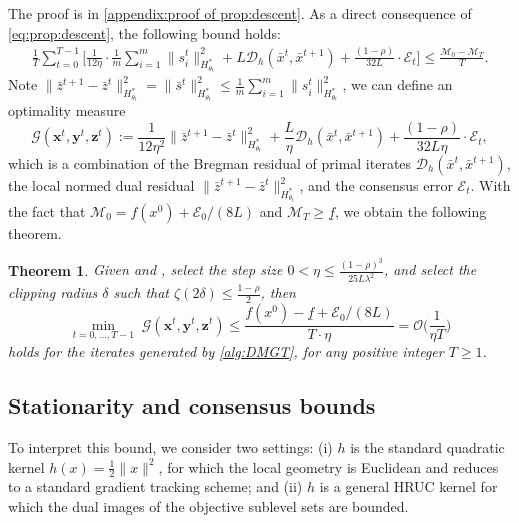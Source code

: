 \documentclass{article}
\theoremstyle{plain}
\newtheorem{theorem}{Theorem}[section]
\theoremstyle{definition}
\theoremstyle{remark}
\newcommand{\sL}{L}
\newcommand{\cO}{\mathcal O}
\newcommand{\cE}{\mathcal E}
\newcommand{\cD}{\mathcal{D}_{h}}
\newcommand{\cM}{\mathcal{M}}
\newcommand{\bx}{\mathbf{x}}
\newcommand{\by}{\mathbf{y}}
\newcommand{\bz}{\mathbf{z}}
\begin{document}
The proof is in \cref{appendix:proof of prop:descent}.
As a direct consequence of \eqref{eq:prop:descent}, the following bound holds:
\begin{equation*} \begin{aligned}
    \frac{1}{T}\sum_{t=0}^{T-1} \bigg[\frac{1}{12\eta}\cdot \frac{1}{m}{\sum}_{i=1}^m\|s^t_i\|_{H_{\theta_t}^*}^2 + \sL  \cD(\bar x^t,\bar x^{t+1}) + \frac{(1-\rho)}{32 \sL}\cdot \cE_t \bigg] \leq \frac{\cM_0- \cM_T}{T}.
\end{aligned} \end{equation*}
Note $\|\bar{z}^{t+1}-\bar{z}^t\|^2_{H_{\theta_t}^*} = \|\bar{s}^t\|^2_{H_{\theta_t}^*}\leq\frac{1}{m}\sum_{i=1}^m\|s^t_i\|_{H_{\theta_t}^*}^2$, we can define an optimality measure 
\begin{equation*} \mathcal{G}(\bx^t,\by^t,\bz^t):=\frac{1}{12\eta^2}\|\bar{z}^{t+1}-\bar{z}^t\|^2_{H_{\theta_t}^*} + \frac{\sL}{\eta}\cD(\bar x^t,\bar x^{t+1}) + \frac{(1-\rho)}{32 \sL\eta}\cdot \cE_t, \end{equation*}
which is a combination of the Bregman residual of primal iterates $\cD(\bar x^t,\bar x^{t+1})$, the local normed dual residual $\|\bar{z}^{t+1}-\bar{z}^t\|^2_{H_{\theta_t}^*}$, and the consensus error $\cE_t$. With the fact that $\cM_0 = f(x^0) + \cE_0/(8\sL)$ and $\cM_T \geq \underline{f}$, we obtain the following theorem.  

\begin{theorem}
\label{thm:complexity}
Given  and , select the step size $0<\eta \leq \frac{(1-\rho)^{3}}{25\sL\lambda^2}$, and select the clipping radius $\delta$ such that  $\zeta(2\delta)\leq\frac{1-\rho}{2}$,  then
\begin{equation*}
    \min_{t=0,\ldots,T-1}\; \mathcal{G}(\bx^t,\by^t,\bz^t) \leq  \frac{f(x^0)- \underline{f}{}+\cE_0/(8\sL)}{T\cdot\eta}  = \cO\Big(\frac{1}{\eta T}\Big) 
\end{equation*} 
holds for the iterates generated by \cref{alg:DMGT}, for any positive integer $T\geq 1$.
\end{theorem}

\subsection{Stationarity and consensus bounds}\label{subsec:Stationarity and consensus bounds}
To interpret this bound, we consider two settings: (i) $h$ is the standard quadratic kernel $h(x)=\frac{1}{2}\|x\|^2$, for which the local geometry is Euclidean and  reduces to a standard gradient tracking scheme; and (ii) $h$ is a general HRUC kernel for which the dual images of the objective sublevel sets are bounded. \vspace{0.25cm} 
\end{document}
